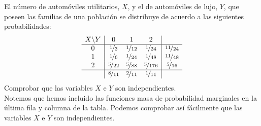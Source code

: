 \begin{ejercicio}
    El número de automóviles utilitarios, $X$, y el de automóviles de lujo, $Y$, que poseen las familias de una población se distribuye de acuerdo a las siguientes probabilidades:
    \begin{equation*}
        \begin{array}{c|ccc|c}
            X \backslash Y & 0 & 1 & 2 & \\
            \hline
            0 & \nicefrac{1}{3} & \nicefrac{1}{12} & \nicefrac{1}{24} & \nicefrac{11}{24}\\
            1 & \nicefrac{1}{6} & \nicefrac{1}{24} & \nicefrac{1}{48} & \nicefrac{11}{48} \\
            2 & \nicefrac{5}{22} & \nicefrac{5}{88} & \nicefrac{5}{176} & \nicefrac{5}{16} \\ \hline
            & \nicefrac{8}{11} & \nicefrac{2}{11} & \nicefrac{1}{11} &
        \end{array}
    \end{equation*}
    Comprobar que las variables $X$ e $Y$ son independientes.\\

    Notemos que hemos incluido las funciones masa de probabilidad marginales en la última fila y columna de la tabla. Podemos comprobar así fácilmente que las variables $X$ e $Y$ son independientes.
\end{ejercicio}

